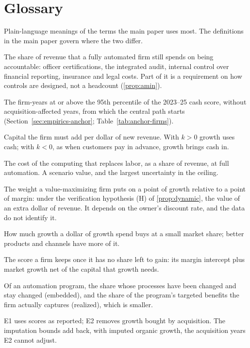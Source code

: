 \section{Glossary}\label{supp:glossary}
Plain-language meanings of the terms the main paper uses most. The definitions in the main paper govern where the two differ.

{\small
\begin{description}[leftmargin=0pt,itemsep=2pt]
\item[Accountability floor ($a_{\min}$).] The share of revenue that a fully automated firm still spends on being accountable: officer certifications, the integrated audit, internal control over financial reporting, insurance and legal costs. Part of it is a requirement on how controls are designed, not a headcount (\autoref{prop:amin}).
\item[Anchor.] The firm-years at or above the 95th percentile of the 2023--25 cash score, without acquisition-affected years, from which the central path starts (Section~\ref{sec:empirics-anchor}; Table~\ref{tab:anchor-firms}).
\item[Capital intensity ($k$).] Capital the firm must add per dollar of new revenue. With $k>0$ growth uses cash; with $k<0$, as when customers pay in advance, growth brings cash in.
\item[Compute share ($c_c$).] The cost of the computing that replaces labor, as a share of revenue, at full automation. A scenario value, and the largest uncertainty in the ceiling.
\item[Decision weight.] The weight a value-maximizing firm puts on a point of growth relative to a point of margin: under the verification hypothesis (H) of \autoref{prop:dynamic}, the value of an extra dollar of revenue. It depends on the owner's discount rate, and the data do not identify it.
\item[Demand pull.] How much growth a dollar of growth spend buys at a small market share; better products and channels have more of it.
\item[Durable (saturated) score.] The score a firm keeps once it has no share left to gain: its margin intercept plus market growth net of the capital that growth needs.
\item[Embedded and realized shares.] Of an automation program, the share whose processes have been changed and stay changed (embedded), and the share of the program's targeted benefits the firm actually captures (realized), which is smaller.
\item[Estimands E1 and E2.] E1 uses scores as reported; E2 removes growth bought by acquisition. The imputation bounds add back, with imputed organic growth, the acquisition years E2 cannot adjust.

\end{description}}
